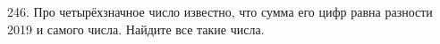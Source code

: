 246. Про четырёхзначное число известно, что сумма его цифр равна разности 2019 и самого числа. Найдите все такие числа.\\
